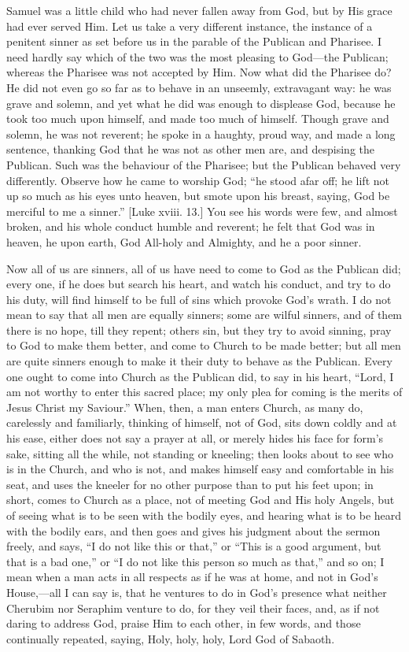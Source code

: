 Samuel was a little child who had never fallen away from God, but
by His grace had ever served Him. Let us take a very different
instance, the instance of a penitent sinner as set before us in the
parable of the Publican and Pharisee. I need hardly say which of the
two was the most pleasing to God—the Publican; whereas the Pharisee
was not accepted by Him. Now what did the Pharisee do? He did not even
go so far as to behave in an unseemly, extravagant way: he was grave
and solemn, and yet what he did was enough to displease God, because
he took too much upon himself, and made too much of himself. Though
grave and solemn, he was not reverent; he spoke in a haughty, proud
way, and made a long sentence, thanking God that he was not as other
men are, and despising the Publican. Such was the behaviour of the
Pharisee; but the Publican behaved very differently. Observe how he
came to worship God; ``he stood afar off; he lift not up so much
as his eyes unto heaven, but smote upon his breast, saying, God be
merciful to me a sinner.'' [Luke xviii. 13.] You see his words
were few, and almost broken, and his whole conduct humble and
reverent; he felt that God was in heaven, he upon earth, God All-holy
and Almighty, and he a poor sinner.

Now all of us are sinners, all of us have need to come to God as
the Publican did; every one, if he does but search his heart, and
watch his conduct, and try to do his duty, will find himself to be
full of sins which provoke God's wrath. I do not mean to say that all
men are equally sinners; some are wilful sinners, and of them there is
no hope, till they repent; others sin, but they try to avoid sinning,
pray to God to make them better, and come to Church to be made better;
but all men are quite sinners enough to make it their duty to behave
as the Publican. Every one ought to come into Church as the Publican
did, to say in his heart, ``Lord, I am not worthy to enter this
sacred place; my only plea for coming is the merits of Jesus Christ my
Saviour.'' When, then, a man enters Church, as many do, carelessly
and familiarly, thinking of himself, not of God, sits down coldly and
at his ease, either does not say a prayer at all, or merely hides his
face for form's sake, sitting all the while, not standing or kneeling;
then looks about to see who is in the Church, and who is not, and
makes himself easy and comfortable in his seat, and uses the kneeler
for no other purpose than to put his feet upon; in short, comes to
Church as a place, not of meeting God and His holy Angels, but of
seeing what is to be seen with the bodily eyes, and hearing what is to
be heard with the bodily ears, and then goes and gives his judgment
about the sermon freely, and says, ``I do not like this or
that,'' or ``This is a good argument, but that is a bad
one,'' or ``I do not like this person so much as that,''
and so on; I mean when a man acts in all respects as if he was at
home, and not in God's House,—all I can say is, that he ventures to
do in God's presence what neither Cherubim nor Seraphim venture to do,
for they veil their faces, and, as if not daring to address God,
praise Him to each other, in few words, and those continually
repeated, saying, Holy, holy, holy, Lord God of Sabaoth.

